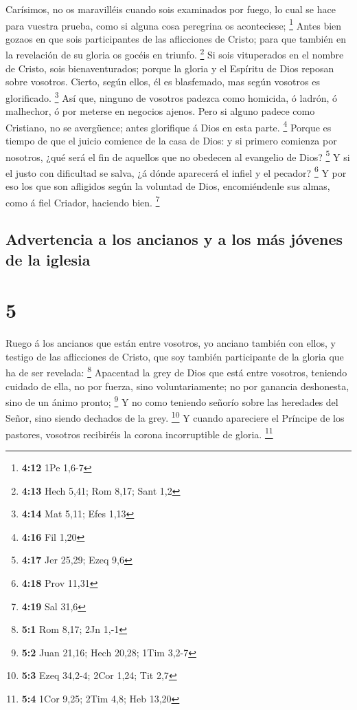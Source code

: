  Carísimos, no os maravilléis cuando sois examinados por
fuego, lo cual se hace para vuestra prueba, como si alguna cosa
peregrina os aconteciese; \footnote{\textbf{4:12} 1Pe 1,6-7}
 Antes bien gozaos en que sois participantes de las
aflicciones de Cristo; para que también en la revelación de su gloria os
gocéis en triunfo. \footnote{\textbf{4:13} Hech 5,41; Rom 8,17; Sant 1,2}
 Si sois vituperados en el nombre de Cristo, sois
bienaventurados; porque la gloria y el Espíritu de Dios reposan sobre
vosotros. Cierto, según ellos, él es blasfemado, mas según vosotros es
glorificado. \footnote{\textbf{4:14} Mat 5,11; Efes 1,13} 
Así que, ninguno de vosotros padezca como homicida, ó ladrón, ó
malhechor, ó por meterse en negocios ajenos.  Pero si
alguno padece como Cristiano, no se avergüence; antes glorifique á Dios
en esta parte. \footnote{\textbf{4:16} Fil 1,20}  Porque es
tiempo de que el juicio comience de la casa de Dios: y si primero
comienza por nosotros, ¿qué será el fin de aquellos que no obedecen al
evangelio de Dios? \footnote{\textbf{4:17} Jer 25,29; Ezeq 9,6}
 Y si el justo con dificultad se salva, ¿á dónde aparecerá
el infiel y el pecador? \footnote{\textbf{4:18} Prov 11,31}
 Y por eso los que son afligidos según la voluntad de Dios,
encomiéndenle sus almas, como á fiel Criador, haciendo bien. \footnote{\textbf{4:19}
  Sal 31,6}

\hypertarget{advertencia-a-los-ancianos-y-a-los-muxe1s-juxf3venes-de-la-iglesia}{%
\subsection{Advertencia a los ancianos y a los más jóvenes de la
iglesia}\label{advertencia-a-los-ancianos-y-a-los-muxe1s-juxf3venes-de-la-iglesia}}

\hypertarget{section-4}{%
\section{5}\label{section-4}}

 Ruego á los ancianos que están entre vosotros, yo anciano
también con ellos, y testigo de las aflicciones de Cristo, que soy
también participante de la gloria que ha de ser revelada: \footnote{\textbf{5:1}
  Rom 8,17; 2Jn 1,-1}  Apacentad la grey de Dios que está
entre vosotros, teniendo cuidado de ella, no por fuerza, sino
voluntariamente; no por ganancia deshonesta, sino de un ánimo pronto;
\footnote{\textbf{5:2} Juan 21,16; Hech 20,28; 1Tim 3,2-7} 
Y no como teniendo señorío sobre las heredades del Señor, sino siendo
dechados de la grey. \footnote{\textbf{5:3} Ezeq 34,2-4; 2Cor 1,24; Tit
  2,7}  Y cuando apareciere el Príncipe de los pastores,
vosotros recibiréis la corona incorruptible de gloria. \footnote{\textbf{5:4}
  1Cor 9,25; 2Tim 4,8; Heb 13,20}

